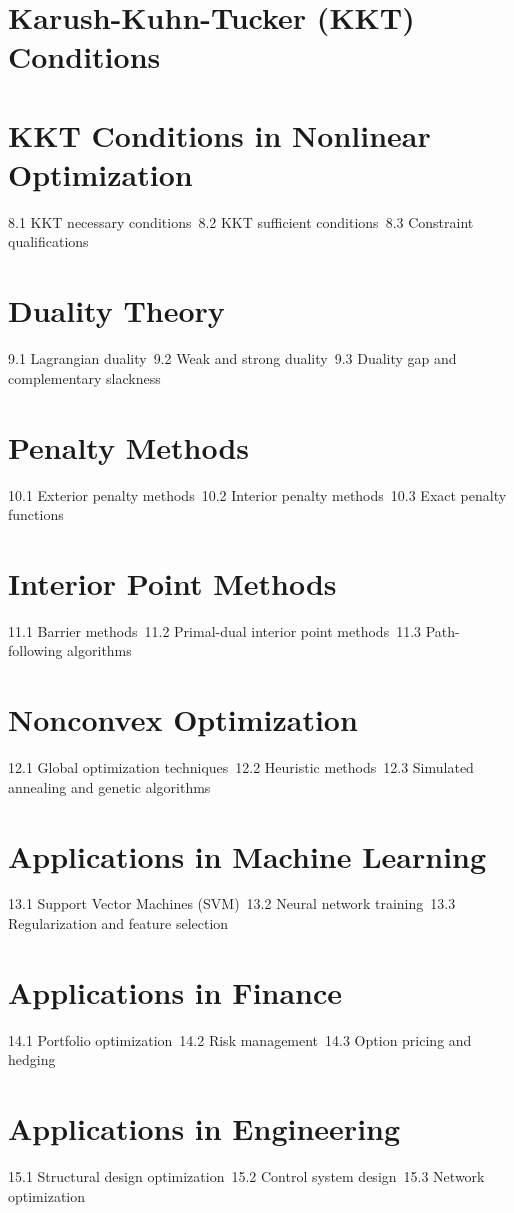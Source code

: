\section{Karush-Kuhn-Tucker (KKT) Conditions}
\section{KKT Conditions in Nonlinear Optimization}
8.1 KKT necessary conditions\
8.2 KKT sufficient conditions\
8.3 Constraint qualifications\
\section{Duality Theory}
9.1 Lagrangian duality\
9.2 Weak and strong duality\
9.3 Duality gap and complementary slackness\
\section{Penalty Methods}
10.1 Exterior penalty methods\
10.2 Interior penalty methods\
10.3 Exact penalty functions\
\section{Interior Point Methods}
11.1 Barrier methods\
11.2 Primal-dual interior point methods\
11.3 Path-following algorithms\
\section{Nonconvex Optimization}
12.1 Global optimization techniques\
12.2 Heuristic methods\
12.3 Simulated annealing and genetic algorithms\
\section{Applications in Machine Learning}
13.1 Support Vector Machines (SVM)\
13.2 Neural network training\
13.3 Regularization and feature selection\
\section{Applications in Finance}
14.1 Portfolio optimization\
14.2 Risk management\
14.3 Option pricing and hedging\
\section{Applications in Engineering}
15.1 Structural design optimization\
15.2 Control system design\
15.3 Network optimization\
